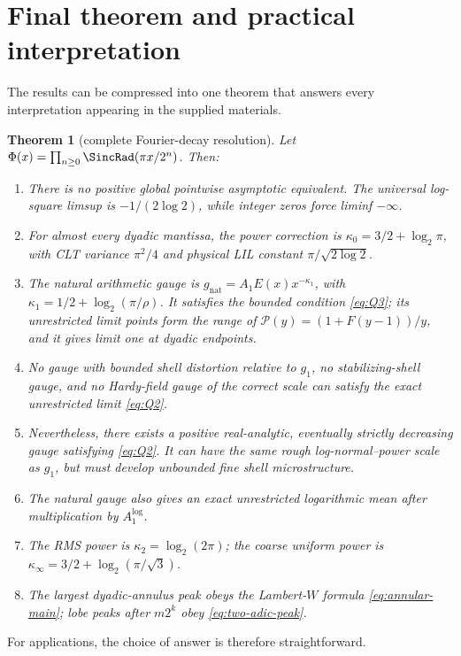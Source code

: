 \documentclass[11pt,oneside]{article}
\newtheorem{theorem}{Theorem}[section]
\theoremstyle{definition}
\theoremstyle{remark}
\begin{document}
\section{Final theorem and practical interpretation}
\label{sec:final}

The results can be compressed into one theorem that answers every interpretation
appearing in the supplied materials.

\begin{theorem}[complete Fourier-decay resolution]
\label{thm:complete}
Let
\(\Phi(x)=\prod_{n\ge0}\SincRad(\pi x/2^n)\).  Then:
\begin{enumerate}
\item There is no positive global pointwise asymptotic equivalent.  The
universal log-square limsup is \(-1/(2\log2)\), while integer zeros force
liminf \(-\infty\).
\item For almost every dyadic mantissa, the power correction is
\(\kappa_0=3/2+\log_2\pi\), with CLT variance \(\pi^2/4\) and physical LIL
constant \(\pi/\sqrt{2\log2}\).
\item The natural arithmetic gauge is
\(g_{\mathrm{nat}}=A_1E(x)x^{-\kappa_1}\), with
\(\kappa_1=1/2+\log_2(\pi/\rho)\).  It satisfies the bounded condition
\eqref{eq:Q3}; its unrestricted limit points form the range of
\(\mathscr P(y)=(1+F(y-1))/y\), and it gives limit one at dyadic endpoints.
\item No gauge with bounded shell distortion relative to \(g_1\), no
stabilizing-shell gauge, and no Hardy-field gauge of the correct scale can
satisfy the exact unrestricted limit \eqref{eq:Q2}.
\item Nevertheless, there exists a positive real-analytic, eventually strictly
decreasing gauge satisfying \eqref{eq:Q2}.  It can have the same rough
log-normal--power scale as \(g_1\), but must develop unbounded fine shell
microstructure.
\item The natural gauge also gives an exact unrestricted logarithmic mean after
multiplication by \(A_1^{\log}\).
\item The RMS power is \(\kappa_2=\log_2(2\pi)\); the coarse uniform power is
\(\kappa_\infty=3/2+\log_2(\pi/\sqrt3)\).
\item The largest dyadic-annulus peak obeys the Lambert-\(W\) formula
\eqref{eq:annular-main}; lobe peaks after \(m2^k\) obey
\eqref{eq:two-adic-peak}.
\end{enumerate}
\end{theorem}

For applications, the choice of answer is therefore straightforward.
\end{document}
